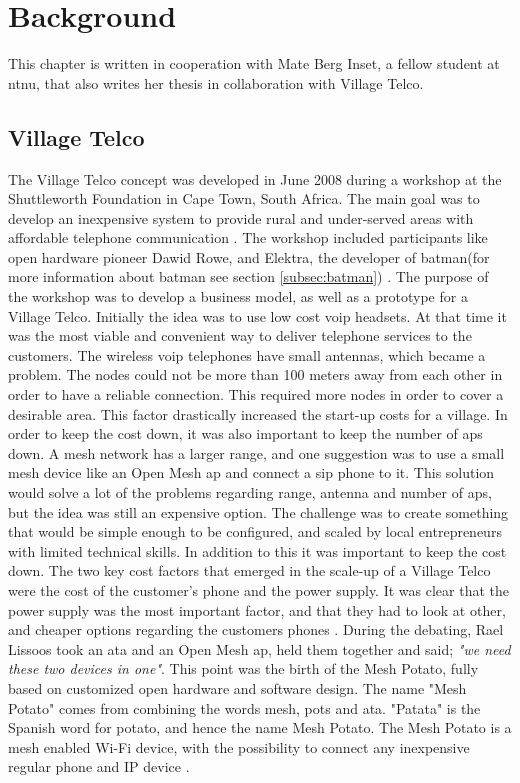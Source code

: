 \chapter{Background}
\label{chp:background} 

This chapter is written in cooperation with Mate Berg Inset, a fellow student at \gls{ntnu}, that also writes her thesis in collaboration with Village Telco.

\section{Village Telco}
The Village Telco concept was developed in June 2008 during a workshop at the Shuttleworth Foundation in Cape Town, South Africa. The main goal was to develop an inexpensive system to provide rural and under-served areas with affordable telephone communication \cite{MParticle}. The workshop included participants like open hardware pioneer Dawid Rowe, and Elektra, the developer of \gls{batman}(for more information about \gls{batman} see section \ref{subsec:batman}) \cite{MPworkshop}. The purpose of the workshop was to develop a business model, as well as a prototype for a Village Telco. Initially the idea was to use low cost \gls{voip} headsets. At that time it was the most viable and convenient way to deliver telephone services to the customers. The wireless \gls{voip} telephones have small antennas, which became a problem. The nodes could not be more than 100 meters away from each other in order to have a reliable connection. This required more nodes in order to cover a desirable area. This factor drastically increased the start-up costs for a village. In order to keep the cost down, it was also important to keep the number of \glspl{ap} down. A mesh network has a larger range, and one suggestion was to use a small mesh device like an Open Mesh \gls{ap} and connect a \gls{sip} phone to it. This solution would solve a lot of the problems regarding range, antenna and number of \glspl{ap}, but the idea was still an expensive option. The challenge was to create something that would be simple enough to be configured, and scaled by local entrepreneurs with limited technical skills. In addition to this it was important to keep the cost down. The two key cost factors that emerged in the scale-up of a Village Telco were the cost of the customer's phone and the power supply. It was clear that the power supply was the most important factor, and that they had to look at other, and cheaper options regarding the customers phones \cite{MPworkshop}. During the debating, Rael Lissoos took an \gls{ata} and an Open Mesh \gls{ap}, held them together and said; \textit{"we need these two devices in one"}. This point was the birth of the Mesh Potato, fully based on customized open hardware and software design. The name "Mesh Potato" comes from combining the words mesh, \gls{pots} and \gls{ata}. "Patata" is the Spanish word for potato, and hence the name Mesh Potato. The Mesh Potato is a mesh enabled Wi-Fi device, with the possibility to connect any inexpensive regular phone and IP device \cite{MPorigin}.


